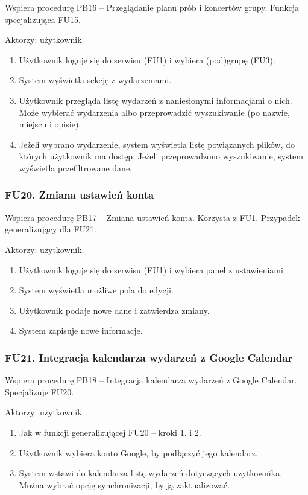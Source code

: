 \documentclass[11pt,a4paper]{article}
\renewcommand{\_}{\char`_}
\begin{document}
Wspiera procedurę PB16 – Przeglądanie planu prób i koncertów grupy. Funkcja specjalizująca FU15.

Aktorzy: użytkownik.
\begin{enumerate}
    \item Użytkownik loguje się do serwisu (FU1) i wybiera (pod)grupę (FU3).
    \item System wyświetla sekcję z wydarzeniami.
    \item Użytkownik przegląda listę wydarzeń z naniesionymi informacjami o nich. Może wybierać wydarzenia albo przeprowadzić wyszukiwanie (po nazwie, miejscu i opisie).
    \item Jeżeli wybrano wydarzenie, system wyświetla listę powiązanych plików, do których użytkownik ma dostęp. Jeżeli przeprowadzono wyszukiwanie, system wyświetla przefiltrowane dane. 
\end{enumerate}

\subsubsection{FU20. Zmiana ustawień konta}

Wspiera procedurę PB17 – Zmiana ustawień konta. Korzysta z FU1. Przypadek generalizujący dla FU21.

Aktorzy: użytkownik.
\begin{enumerate}
    \item Użytkownik loguje się do serwisu (FU1) i wybiera panel z ustawieniami.
    \item System wyświetla możliwe pola do edycji.
    \item Użytkownik podaje nowe dane i zatwierdza zmiany.
    \item System zapisuje nowe informacje.
\end{enumerate}

\subsubsection{FU21. Integracja kalendarza wydarzeń z Google Calendar}

Wspiera procedurę PB18 – Integracja kalendarza wydarzeń z Google Calendar. Specjalizuje FU20.

Aktorzy: użytkownik.
\begin{enumerate}
    \item Jak w funkcji generalizującej FU20 – kroki 1. i 2.
    \item Użytkownik wybiera konto Google, by podłączyć jego kalendarz.
    \item System wstawi do kalendarza listę wydarzeń dotyczących użytkownika. Można wybrać opcję synchronizacji, by ją zaktualizować.
\end{enumerate}
\end{document}
